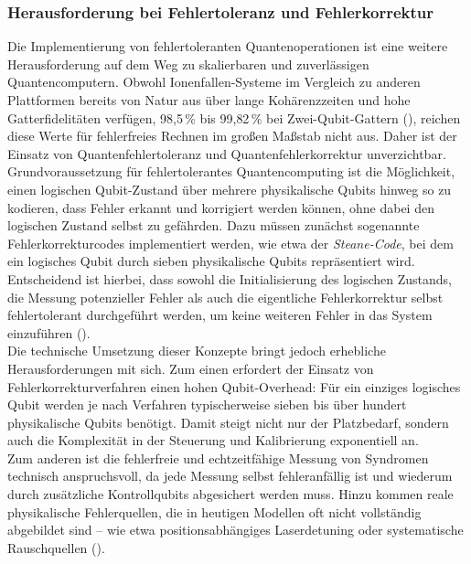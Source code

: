 \subsubsection{Herausforderung bei Fehlertoleranz und Fehlerkorrektur}
Die Implementierung von fehlertoleranten Quantenoperationen ist eine weitere Herausforderung auf dem Weg zu skalierbaren und zuverlässigen Quantencomputern. Obwohl Ionenfallen-Systeme im Vergleich zu anderen Plattformen bereits von Natur aus über lange Kohärenzzeiten und hohe Gatterfidelitäten verfügen, 98{,}5\,\% bis 99{,}82\,\% bei Zwei-Qubit-Gattern (\cite{strohmIonBasedQuantumComputing2024}), reichen diese Werte für fehlerfreies Rechnen im großen Maßstab nicht aus. Daher ist der Einsatz von Quantenfehlertoleranz und Quantenfehlerkorrektur unverzichtbar. \\

Grundvoraussetzung für fehlertolerantes Quantencomputing ist die Möglichkeit, einen logischen Qubit-Zustand über mehrere physikalische Qubits hinweg so zu kodieren, dass Fehler erkannt und korrigiert werden können, ohne dabei den logischen Zustand selbst zu gefährden. Dazu müssen zunächst sogenannte Fehlerkorrekturcodes implementiert werden, wie etwa der \textit{Steane-Code}, bei dem ein logisches Qubit durch sieben physikalische Qubits repräsentiert wird. Entscheidend ist hierbei, dass sowohl die Initialisierung des logischen Zustands, die Messung potenzieller Fehler als auch die eigentliche Fehlerkorrektur selbst fehlertolerant durchgeführt werden, um keine weiteren Fehler in das System einzuführen (\cite{strohmIonBasedQuantumComputing2024}). \\

Die technische Umsetzung dieser Konzepte bringt jedoch erhebliche Herausforderungen mit sich. Zum einen erfordert der Einsatz von Fehlerkorrekturverfahren einen hohen Qubit-Overhead: Für ein einziges logisches Qubit werden je nach Verfahren typischerweise sieben bis über hundert physikalische Qubits benötigt. Damit steigt nicht nur der Platzbedarf, sondern auch die Komplexität in der Steuerung und Kalibrierung exponentiell an. \\

Zum anderen ist die fehlerfreie und echtzeitfähige Messung von Syndromen technisch anspruchsvoll, da jede Messung selbst fehleranfällig ist und wiederum durch zusätzliche Kontrollqubits abgesichert werden muss. Hinzu kommen reale physikalische Fehlerquellen, die in heutigen Modellen oft nicht vollständig abgebildet sind – wie etwa positionsabhängiges Laserdetuning oder systematische Rauschquellen (\cite{strohmIonBasedQuantumComputing2024}). \\

